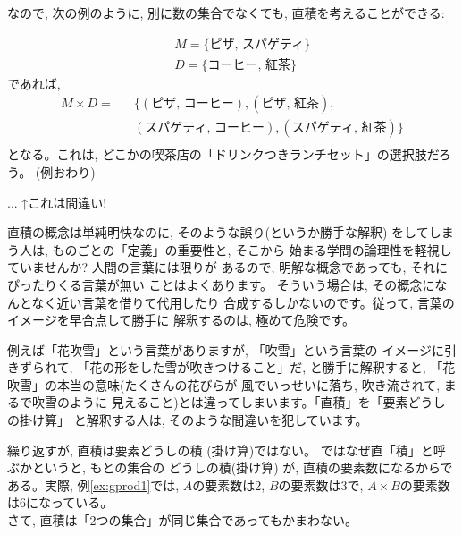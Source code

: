 なので, 次の例のように, 別に数の集合でなくても, 直積を考えることができる:

\begin{exmpl}
\begin{eqnarray}
&&M=\{\text{ピザ, スパゲティ}\}\\
&&D=\{\text{コーヒー, 紅茶}\}
\end{eqnarray}
であれば,
\begin{eqnarray}
M \times D=&&\{(\text{ピザ, コーヒー}), (\text{ピザ, 紅茶}), \nonumber\\
&&(\text{スパゲティ, コーヒー}), (\text{スパゲティ, 紅茶})\}\nonumber\\
\end{eqnarray}
となる。これは, どこかの喫茶店の「ドリンクつきランチセット」の選択肢だろう。
(例おわり)\end{exmpl}
\mv

\begin{freqmiss}{\small{} ... ↑これは間違い!

直積の概念は単純明快なのに, そのような誤り(というか勝手な解釈)
をしてしまう人は, ものごとの「定義」の重要性と, そこから
始まる学問の論理性を軽視していませんか? 人間の言葉には限りが
あるので, 明解な概念であっても, それにぴったりくる言葉が無い
ことはよくあります。
そういう場合は, その概念になんとなく近い言葉を借りて代用したり
合成するしかないのです。従って, 言葉のイメージを早合点して勝手に
解釈するのは, 極めて危険です。

例えば「花吹雪」という言葉がありますが, 「吹雪」という言葉の
イメージに引きずられて, 「花の形をした雪が吹きつけること」だ, 
と勝手に解釈すると, 「花吹雪」の本当の意味(たくさんの花びらが
風でいっせいに落ち, 吹き流されて, まるで吹雪のように
見えること)とは違ってしまいます。「直積」を「要素どうしの掛け算」
と解釈する人は, そのような間違いを犯しています。}\end{freqmiss}

繰り返すが, 直積は要素どうしの積 (掛け算)ではない。
ではなぜ直「積」と呼ぶかというと, もとの集合の
どうしの積(掛け算)
が, 直積の要素数になるからである。実際, 
例\ref{ex:gprod1}では, $A$の要素数は2, $B$の要素数は3で, 
$A\times B$の要素数は6になっている。\\

さて, 直積は「2つの集合」が同じ集合であってもかまわない。


